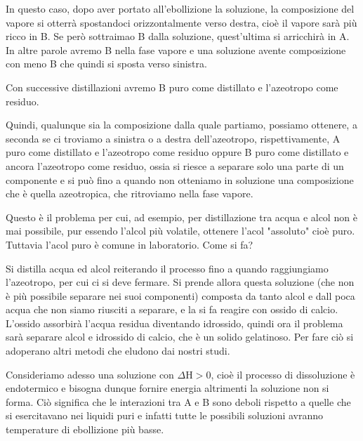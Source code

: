 In questo caso, dopo aver portato all'ebollizione la soluzione, la composizione del vapore si otterrà spostandoci orizzontalmente verso destra, cioè il vapore sarà più ricco in B. Se però sottraimao B dalla soluzione, quest'ultima si arricchirà in A. In altre parole avremo B nella fase vapore e una soluzione avente composizione con meno B che quindi si sposta verso sinistra.

Con successive distillazioni avremo B puro come distillato e l'azeotropo come residuo.

Quindi, qualunque sia la composizione dalla quale partiamo, possiamo ottenere, a seconda se ci troviamo a sinistra o a destra dell'azeotropo, rispettivamente, A puro come distillato e l'azeotropo come residuo oppure B puro come distillato e ancora l'azeotropo come residuo, ossia si riesce a separare solo una parte di un componente e si può fino a quando non otteniamo in soluzione una composizione che è quella azeotropica, che ritroviamo nella fase vapore.

Questo è il problema per cui, ad esempio, per distillazione tra acqua e alcol non è mai possibile, pur essendo l'alcol più volatile, ottenere l'acol "assoluto" cioè puro. Tuttavia l'acol puro è comune in laboratorio. Come si fa?

Si distilla acqua ed alcol reiterando il processo fino a quando raggiungiamo l'azeotropo, per cui ci si deve fermare. Si prende allora questa soluzione (che non è più possibile separare nei suoi componenti) composta da tanto alcol e dall poca acqua che non siamo riusciti a separare, e la si fa reagire con ossido di calcio. L'ossido assorbirà l'acqua residua diventando idrossido, quindi ora il problema sarà separare alcol e idrossido di calcio, che è un solido gelatinoso. Per fare ciò si adoperano altri metodi che eludono dai nostri studi.

\vspace{0.2cm}Consideriamo adesso una soluzione con $\Delta$H$>$0, cioè il processo di dissoluzione è endotermico e bisogna dunque fornire energia altrimenti la soluzione non si forma. Ciò significa che le interazioni tra A e B sono deboli rispetto a quelle che si esercitavano nei liquidi puri e infatti tutte le possibili soluzioni avranno temperature di ebollizione più basse.

